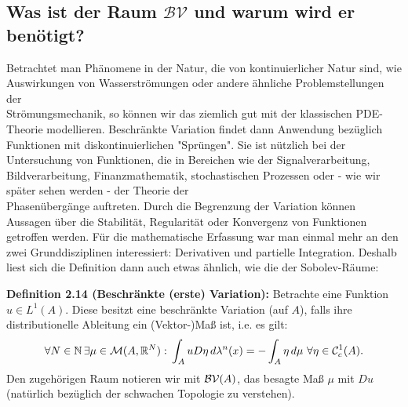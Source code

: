 \subsection[Was ist der Raum BV und warum wird er benötigt?]{Was ist der Raum \(\mathcal{BV}\) und warum wird er benötigt?}{\label{subsec:bvuse}}
Betrachtet man Phänomene in der Natur, die von kontinuierlicher Natur sind, wie\\Auswirkungen von Wasserströmungen oder andere ähnliche Problemstellungen der \\Strömungsmechanik, so können wir das ziemlich gut mit der klassischen PDE-Theorie modellieren. Beschränkte Variation findet dann Anwendung bezüglich Funktionen mit diskontinuierlichen "Sprüngen". Sie ist nützlich bei der Untersuchung von Funktionen, die in Bereichen wie der Signalverarbeitung, Bildverarbeitung, Finanzmathematik, stochastischen Prozessen oder - wie wir später sehen werden - der Theorie der\\Phasenübergänge auftreten. Durch die Begrenzung der Variation können Aussagen über die Stabilität, Regularität oder Konvergenz von Funktionen getroffen werden. Für die mathematische Erfassung war man einmal mehr an den zwei Grunddisziplinen interessiert: Derivativen und partielle Integration. Deshalb liest sich die Definition dann auch etwas ähnlich, wie die der Sobolev-Räume:\\[0.5cm]
\colorbox{generalYellow}{\begin{minipage}{16cm}{\textcolor{black}{}{\label{def2.14}}}
\textbf{Definition 2.14 (Beschränkte (erste) Variation):} Betrachte eine Funktion \(u \in L^1(A)\). Diese besitzt eine beschränkte Variation (auf \(A\)), falls ihre distributionelle Ableitung ein (Vektor-)Maß ist, i.e. es gilt:
\begin{equation}
    \forall N \in \mathbb{N} \, \exists \mu \in \mathcal{M}(A,\mathbb{R}^N) : \, \int_{A} u D\eta \, d\lambda^n(x) = - \int_{A} \eta \, d\mu \, \, \forall \eta \in \mathcal{C}^1_c(A).
\end{equation}
Den zugehörigen Raum notieren wir mit \(\mathcal{BV}(A)\), das besagte Maß \(\mu\) mit \(Du\) (natürlich bezüglich der schwachen Topologie zu verstehen).
\end{minipage}}\\

